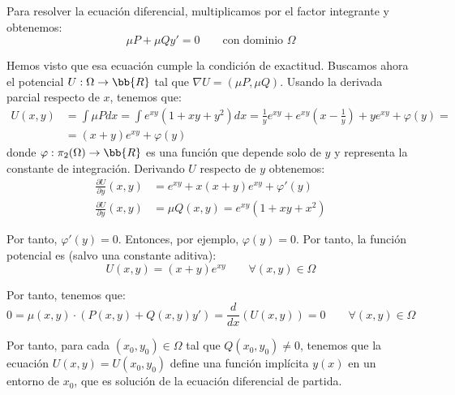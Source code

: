 \begin{ejercicio}
    Para resolver la ecuación diferencial, multiplicamos por el factor integrante y obtenemos:
    \begin{equation*}
        \mu P + \mu Q y' = 0 \qquad \text{con dominio }\Omega
    \end{equation*}

    Hemos visto que esa ecuación cumple la condición de exactitud. Buscamos ahora el potencial $U:\Omega\to\bb{R}$ tal que $\nabla U=(\mu P,\mu Q)$. Usando la derivada parcial respecto de $x$, tenemos que:
    \begin{align*}
        U(x,y)&=\int \mu P dx = \int e^{xy}(1+xy+y^2) dx = \frac{1}{y}e^{xy} + e^{xy}\left(x-\frac{1}{y}\right) + ye^{xy} + \varphi(y)=\\
        &= (x+y)e^{xy} + \varphi(y)
    \end{align*}
    donde $\varphi:\pi_2(\Omega)\to\bb{R}$ es una función que depende solo de $y$ y representa la constante de integración. Derivando $U$ respecto de $y$ obtenemos:
    \begin{align*}
        \frac{\partial U}{\partial y}(x,y)&=e^{xy} + x(x+y)e^{xy} + \varphi'(y)\\
        \frac{\partial U}{\partial y}(x,y)&=\mu Q(x,y)=e^{xy}(1+xy+x^2)
    \end{align*}

    Por tanto, $\varphi'(y)=0$. Entonces, por ejemplo, $\varphi(y)=0$. Por tanto, la función potencial es (salvo una constante aditiva):
    \begin{equation*}
        U(x,y)=(x+y)e^{xy}\qquad \forall (x,y)\in\Omega
    \end{equation*}

    Por tanto, tenemos que:
    \begin{equation*}
        0=\mu(x,y)\cdot (P(x,y)+Q(x,y)y')=\dfrac{d}{dx}\left(U(x,y)\right)=0\qquad \forall (x,y)\in\Omega
    \end{equation*}

    Por tanto, para cada $(x_0, y_0)\in \Omega$ tal que $Q(x_0,y_0)\neq 0$, tenemos que la ecuación $U(x,y)=U(x_0,y_0)$ define una función implícita $y(x)$ en un entorno de $x_0$, que es solución de la ecuación diferencial de partida.
\end{ejercicio}

